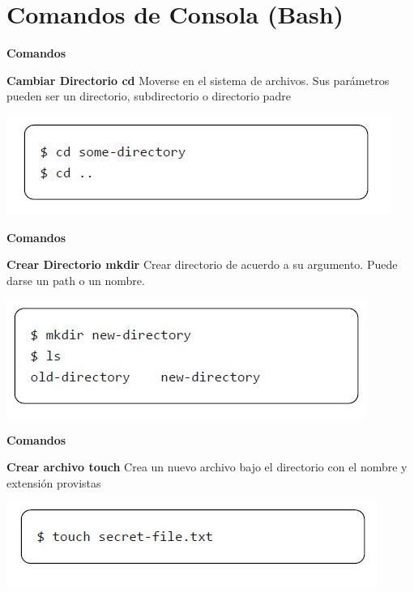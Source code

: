 \documentclass{beamer}
\begin{document}
\section{Comandos de Consola (Bash)}


\begin{frame}
	
	\textbf{Comandos}
	\begin{block}{\textbf{Cambiar Directorio cd}}
		Moverse en el sistema de archivos. 
		Sus parámetros pueden ser un directorio, subdirectorio o directorio padre\\
	\end{block}	
	\begin{center}
		\includegraphics[scale=.6]{img/bash/cd.JPG}
	\end{center}
	
\end{frame}

\begin{frame}
	
	\textbf{Comandos}
	\begin{block}{\textbf{Crear Directorio mkdir}}
		Crear directorio de acuerdo a su argumento. Puede darse un path o un nombre.
	\end{block}	
	\begin{center}
		\includegraphics[scale=.6]{img/bash/mkdir.JPG}
	\end{center}
	
\end{frame}

\begin{frame}

	\textbf{Comandos}
	\begin{block}{\textbf{Crear archivo touch}}
		Crea un nuevo archivo bajo el directorio con el nombre y extensión provistas
	\end{block}	
	\begin{center}
		\includegraphics[scale=.6]{img/bash/touch.JPG}
	\end{center}

\end{frame}
\end{document}
